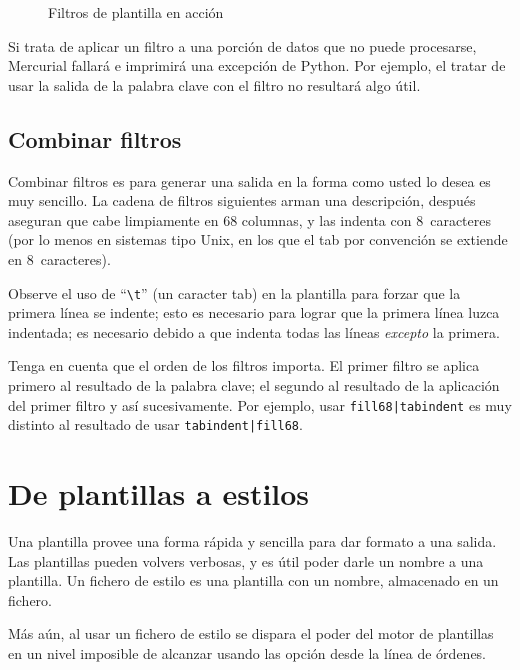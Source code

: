 {{\begin{figure}
  \caption{Filtros de plantilla en acción}
  \label{fig:template:filters}
\end{figure}

\begin{note}
  Si trata de aplicar un filtro a una porción de datos que no puede
  procesarse, Mercurial fallará e imprimirá una excepción de Python.
  Por ejemplo, el tratar de usar la salida de la palabra clave
   con el filtro  no resultará
  algo útil.
\end{note}

\subsection{Combinar filtros}

Combinar filtros es para generar una salida en la forma como usted lo
desea es muy sencillo.  La cadena de filtros siguientes arman una
descripción, después aseguran que cabe limpiamente en 68 columnas, y
las indenta con 8~caracteres (por lo menos en sistemas tipo Unix, en
los que el tab por convención se extiende en 8~caracteres).


Observe el uso de ``\Verb+\t+'' (un caracter tab) en la plantilla para
forzar que la primera línea se indente; esto es necesario para lograr
que la primera línea luzca indentada;  es necesario debido a que
 indenta todas las líneas \emph{excepto} la primera.

Tenga en cuenta que el orden de los filtros importa.  El primer filtro
se aplica primero al resultado de la palabra clave; el segundo al
resultado de la aplicación del primer filtro y así sucesivamente.  Por
ejemplo, usar \Verb+fill68|tabindent+ es muy distinto al resultado de
usar \Verb+tabindent|fill68+.


\section{De plantillas a estilos}

Una plantilla provee una forma rápida y sencilla para dar formato a
una salida.  Las plantillas pueden volvers verbosas, y es útil poder
darle un nombre a una plantilla.  Un fichero de estilo es una
plantilla con un nombre, almacenado en un fichero.

Más aún, al usar un fichero de estilo se dispara el poder del motor de
plantillas en un nivel imposible de alcanzar usando las opción
 desde la línea de órdenes.


}}
